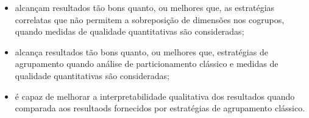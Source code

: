 \documentclass[
    12pt,                %
    oneside,            %
    a4paper,            %
    english,            %
    brazil                %
    ]{abntex2ppgsi}
\begin{document}
\begin{itemize}
    \item alcançam resultados tão bons quanto, ou melhores que, as estratégias correlatas que não permitem a sobreposição de dimensões nos cogrupos, quando medidas de qualidade quantitativas são consideradas;
    \item alcança resultados tão bons quanto, ou melhores que, estratégias de agrupamento quando análise de particionamento clássico e medidas de qualidade quantitativas são consideradas;
    \item é capaz de melhorar a interpretabilidade qualitativa dos resultados quando comparada aos resultaods fornecidos por estratégias de agrupamento clássico.
\end{itemize}








\end{document}
